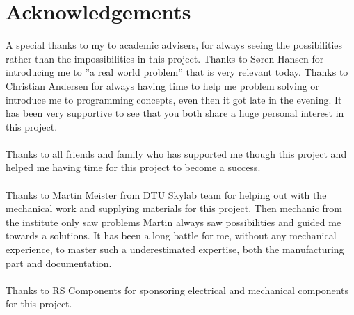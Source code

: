 \chapter{Acknowledgements}
A special thanks to my to academic advisers, for always seeing the possibilities rather than the impossibilities in this project. Thanks to Søren Hansen for introducing me to ''a real world problem'' that is very relevant today. Thanks to Christian Andersen for always having time to help me problem solving or introduce me to programming concepts, even then it got late in the evening. It has been very supportive to see that you both share a huge personal interest in this project.\\ 
\\
Thanks to all friends and family who has supported me though this project and helped me having time for this project to become a success. \\ 
\\
Thanks to Martin Meister from DTU Skylab team for helping out with the mechanical work and supplying materials for this project. Then mechanic from the institute only saw problems Martin always saw possibilities and guided me towards a solutions. It has been a long battle for me, without any mechanical experience, to master such a underestimated expertise, both the manufacturing part and documentation. \\
\\
Thanks to RS Components for sponsoring electrical and mechanical components for this project. 